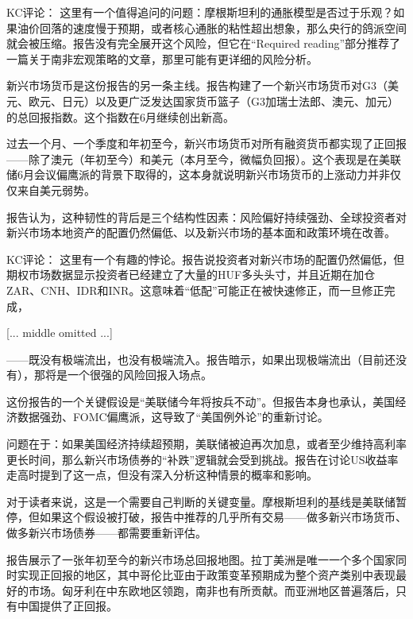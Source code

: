 \documentclass[11pt]{ctexart}
\begin{document}
KC评论： 这里有一个值得追问的问题：摩根斯坦利的通胀模型是否过于乐观？如果油价回落的速度慢于预期，或者核心通胀的粘性超出想象，那么央行的鸽派空间就会被压缩。报告没有完全展开这个风险，但它在“Required reading”部分推荐了一篇关于南非宏观策略的文章，那里可能有更详细的风险分析。

新兴市场货币是这份报告的另一条主线。报告构建了一个新兴市场货币对G3（美元、欧元、日元）以及更广泛发达国家货币篮子（G3加瑞士法郎、澳元、加元）的总回报指数。这个指数在6月继续创出新高。

过去一个月、一个季度和年初至今，新兴市场货币对所有融资货币都实现了正回报——除了澳元（年初至今）和美元（本月至今，微幅负回报）。这个表现是在美联储6月会议偏鹰派的背景下取得的，这本身就说明新兴市场货币的上涨动力并非仅仅来自美元弱势。

报告认为，这种韧性的背后是三个结构性因素：风险偏好持续强劲、全球投资者对新兴市场本地资产的配置仍然偏低、以及新兴市场的基本面和政策环境在改善。

KC评论： 这里有一个有趣的悖论。报告说投资者对新兴市场的配置仍然偏低，但期权市场数据显示投资者已经建立了大量的HUF多头头寸，并且近期在加仓ZAR、CNH、IDR和INR。这意味着“低配”可能正在被快速修正，而一旦修正完成，

[... middle omitted ...]

——既没有极端流出，也没有极端流入。报告暗示，如果出现极端流出（目前还没有），那将是一个很强的风险回报入场点。

这份报告的一个关键假设是“美联储今年将按兵不动”。但报告本身也承认，美国经济数据强劲、FOMC偏鹰派，这导致了“美国例外论”的重新讨论。

问题在于：如果美国经济持续超预期，美联储被迫再次加息，或者至少维持高利率更长时间，那么新兴市场债券的“补跌”逻辑就会受到挑战。报告在讨论US收益率走高时提到了这一点，但没有深入分析这种情景的概率和影响。

对于读者来说，这是一个需要自己判断的关键变量。摩根斯坦利的基线是美联储暂停，但如果这个假设被打破，报告中推荐的几乎所有交易——做多新兴市场货币、做多新兴市场债券——都需要重新评估。

报告展示了一张年初至今的新兴市场总回报地图。拉丁美洲是唯一一个多个国家同时实现正回报的地区，其中哥伦比亚由于政策变革预期成为整个资产类别中表现最好的市场。匈牙利在中东欧地区领跑，南非也有所贡献。而亚洲地区普遍落后，只有中国提供了正回报。
\end{document}
